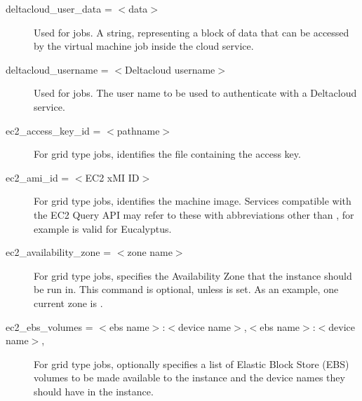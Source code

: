 \begin{description}

\label{condor-submit-deltacloud-user-data}
\item[deltacloud\_user\_data = $<$data$>$]
Used for  jobs.
A string, representing a block of data that can be accessed 
by the virtual machine job inside the cloud service.


\label{condor-submit-deltacloud-username}
\item[deltacloud\_username = $<$Deltacloud username$>$]
Used for  jobs.
The user name to be used to authenticate with a Deltacloud service.


\label{condor-submit-ec2-access-key-id}
\item[ec2\_access\_key\_id = $<$pathname$>$]
For grid type  jobs,
identifies the file containing the access key.  


\label{condor-submit-ec2-ami-id}
\item[ec2\_ami\_id = $<$EC2 xMI ID$>$]
For grid type  jobs, identifies the machine image.
Services compatible with the EC2 Query API may refer to these
with abbreviations other than ,
for example  is valid for Eucalyptus.


\label{condor-submit-ec2-availability-zone}
\item[ec2\_availability\_zone = $<$zone name$>$]
For grid type  jobs, 
specifies the Availability Zone that the instance should be run in. 
This command is optional, unless  is set.
As an example, one current zone is .


\label{condor-submit-ec2-ebs-volumes}
\item[ec2\_ebs\_volumes = $<$ebs name$>$:$<$device name$>$,$<$ebs name$>$:$<$device name$>$,\Dots]
For grid type  jobs,
optionally specifies a list of Elastic Block Store (EBS)
volumes to be made available to the instance and the device names they
should have in the instance.


\end{description}
